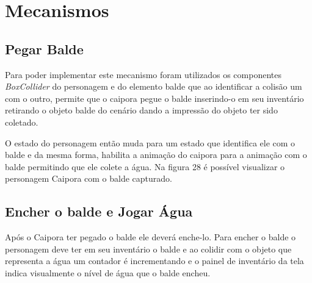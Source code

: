 \section{Mecanismos}

\subsection{Pegar Balde}

 Para poder implementar este mecanismo foram utilizados os componentes \textit{BoxCollider} do personagem e do elemento balde que ao identificar a colisão um com o outro, permite que o caipora pegue o balde inserindo-o em seu inventário retirando o objeto balde do cenário dando a impressão do objeto ter sido coletado.
 
 O estado do personagem então muda para um estado que identifica ele com o balde e da mesma forma, habilita a animação do caipora para a animação com o balde permitindo que ele colete a água. Na figura 28 é possível visualizar o personagem Caipora com o balde capturado.
 \pagebreak

\begin{figure}[h!]
		\centering
	\end{figure}
	
	
\subsection{Encher o balde e Jogar Água}
Após o Caipora ter pegado o balde ele deverá enche-lo. Para encher o balde o personagem deve ter em seu inventário o balde e ao colidir com o objeto que representa a água um contador é incrementando e o painel de inventário da tela indica visualmente o nível de água que o balde encheu. 

